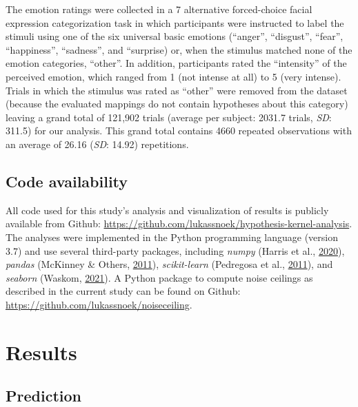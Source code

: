 \documentclass[12pt,american,a4paper,oneside,]{memoir} %
\begin{document}
The emotion ratings were collected in a 7 alternative forced-choice facial expression categorization task in which participants were instructed to label the stimuli using one of the six universal basic emotions (``anger'', ``disgust'', ``fear'', ``happiness'', ``sadness'', and ``surprise) or, when the stimulus matched none of the emotion categories, ``other''. In addition, participants rated the ``intensity'' of the perceived emotion, which ranged from 1 (not intense at all) to 5 (very intense). Trials in which the stimulus was rated as ``other'' were removed from the dataset (because the evaluated mappings do not contain hypotheses about this category) leaving a grand total of 121,902 trials (average per subject: 2031.7 trials, \emph{SD}: 311.5) for our analysis. This grand total contains 4660 repeated observations with an average of 26.16 (\emph{SD}: 14.92) repetitions.

\hypertarget{hka-code}{%
\subsection{Code availability}\label{hka-code}}

All code used for this study's analysis and visualization of results is publicly available from Github: \url{https://github.com/lukassnoek/hypothesis-kernel-analysis}. The analyses were implemented in the Python programming language (version 3.7) and use several third-party packages, including \emph{numpy} (Harris et al., \protect\hyperlink{ref-Harris2020-en}{2020}), \emph{pandas} (McKinney \& Others, \protect\hyperlink{ref-McKinney2011-kl}{2011}), \emph{scikit-learn} (Pedregosa et al., \protect\hyperlink{ref-pedregosa2011scikit}{2011}), and \emph{seaborn} (Waskom, \protect\hyperlink{ref-waskom2021seaborn}{2021}). A Python package to compute noise ceilings as described in the current study can be found on Github: \url{https://github.com/lukassnoek/noiseceiling}.

\hypertarget{hka-results}{%
\section{Results}\label{hka-results}}

\hypertarget{prediction}{%
\subsection{Prediction}\label{prediction}}
\end{document}
